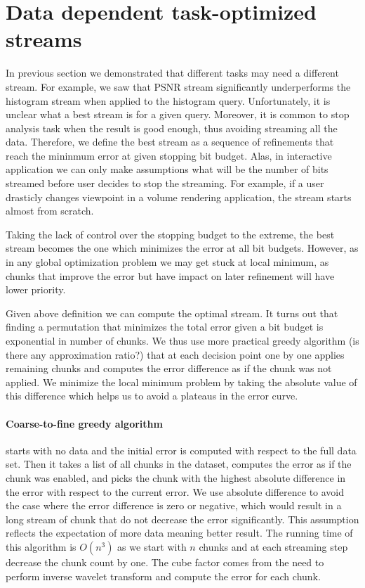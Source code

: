 \section{Data dependent task-optimized streams}

In previous section we demonstrated that different tasks may need a different stream. For example, we saw
that PSNR stream significantly underperforms the histogram stream when applied to the histogram query.
Unfortunately, it is unclear what a best stream is for a given query. Moreover, it is common to stop analysis
task when the result is good enough, thus avoiding streaming all the data. Therefore, we define the best stream as
a sequence of refinements that reach the mininmum error at given stopping bit budget. Alas, in interactive application
we can only make assumptions what will be the number of bits streamed before user decides to stop the streaming. For
example, if a user drasticly changes viewpoint in a volume rendering application, the stream starts almost from scratch.

Taking the lack of control over the stopping budget to the extreme, the best stream becomes the one which minimizes
the error at all bit budgets. However, as in any global optimization problem we may get stuck at local minimum, as
chunks that improve the error but have impact on later refinement will have lower priority.

Given above definition we can compute the optimal stream. It turns out that finding a permutation that minimizes
the total error given a bit budget is exponential in number of chunks. We thus use more practical greedy algorithm (is there
any approximation ratio?) that at each decision point one by one applies remaining chunks and computes the error
difference as if the chunk was not applied. We minimize the local minimum problem by taking the absolute value
of this difference which helps us to avoid a plateaus in the error curve.

\paragraph*{Coarse-to-fine greedy algorithm} starts with no data and the initial error is computed with respect
to the full data set. Then it takes a list of all chunks in the dataset, computes the error as if the chunk was
enabled, and picks the chunk with the highest absolute difference in the error with respect to the current error.
We use absolute difference to avoid the case where the error difference is zero or negative, which would result
in a long stream of chunk that do not decrease the error significantly. This assumption reflects the expectation
of more data meaning better result. The running time of this algorithm is $O(n^3)$ as we start with $n$ chunks
and at each streaming step decrease the chunk count by one. The cube factor comes from the need to perform inverse
wavelet transform and compute the error for each chunk.





